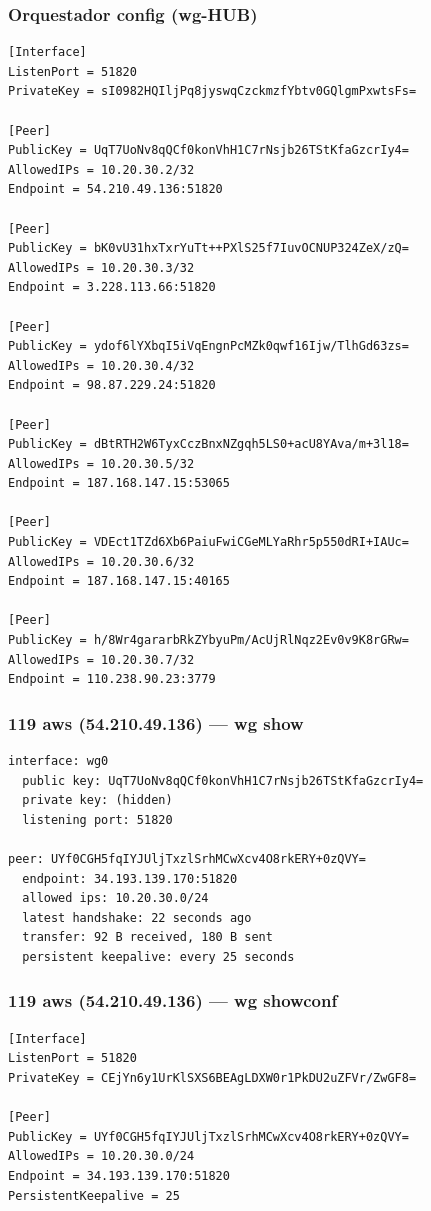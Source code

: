 \documentclass[11pt,a4paper]{article}
\begin{document}
\subsubsection*{Orquestador config (wg-HUB)}
\begin{lstlisting}
[Interface]
ListenPort = 51820
PrivateKey = sI0982HQIljPq8jyswqCzckmzfYbtv0GQlgmPxwtsFs=

[Peer]
PublicKey = UqT7UoNv8qQCf0konVhH1C7rNsjb26TStKfaGzcrIy4=
AllowedIPs = 10.20.30.2/32
Endpoint = 54.210.49.136:51820

[Peer]
PublicKey = bK0vU31hxTxrYuTt++PXlS25f7IuvOCNUP324ZeX/zQ=
AllowedIPs = 10.20.30.3/32
Endpoint = 3.228.113.66:51820

[Peer]
PublicKey = ydof6lYXbqI5iVqEngnPcMZk0qwf16Ijw/TlhGd63zs=
AllowedIPs = 10.20.30.4/32
Endpoint = 98.87.229.24:51820

[Peer]
PublicKey = dBtRTH2W6TyxCczBnxNZgqh5LS0+acU8YAva/m+3l18=
AllowedIPs = 10.20.30.5/32
Endpoint = 187.168.147.15:53065

[Peer]
PublicKey = VDEct1TZd6Xb6PaiuFwiCGeMLYaRhr5p550dRI+IAUc=
AllowedIPs = 10.20.30.6/32
Endpoint = 187.168.147.15:40165

[Peer]
PublicKey = h/8Wr4gararbRkZYbyuPm/AcUjRlNqz2Ev0v9K8rGRw=
AllowedIPs = 10.20.30.7/32
Endpoint = 110.238.90.23:3779

\end{lstlisting}

\subsubsection*{119 aws (54.210.49.136) — wg show}
\begin{lstlisting}
interface: wg0
  public key: UqT7UoNv8qQCf0konVhH1C7rNsjb26TStKfaGzcrIy4=
  private key: (hidden)
  listening port: 51820

peer: UYf0CGH5fqIYJUljTxzlSrhMCwXcv4O8rkERY+0zQVY=
  endpoint: 34.193.139.170:51820
  allowed ips: 10.20.30.0/24
  latest handshake: 22 seconds ago
  transfer: 92 B received, 180 B sent
  persistent keepalive: every 25 seconds

\end{lstlisting}

\subsubsection*{119 aws (54.210.49.136) — wg showconf}
\begin{lstlisting}
[Interface]
ListenPort = 51820
PrivateKey = CEjYn6y1UrKlSXS6BEAgLDXW0r1PkDU2uZFVr/ZwGF8=

[Peer]
PublicKey = UYf0CGH5fqIYJUljTxzlSrhMCwXcv4O8rkERY+0zQVY=
AllowedIPs = 10.20.30.0/24
Endpoint = 34.193.139.170:51820
PersistentKeepalive = 25

\end{lstlisting}
\end{document}
